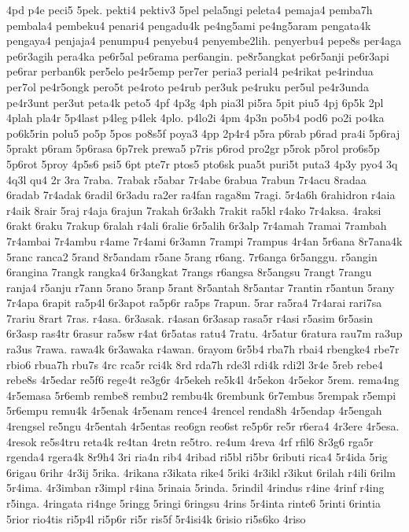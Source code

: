 4pd
p4e
peci5
5pek.
pekti4
pektiv3
5pel
pela5ngi
peleta4
pemaja4
pemba7h
pembala4
pembeku4
penari4
pengadu4k
pe4ng5ami
pe4ng5aram
pengata4k
pengaya4
penjaja4
penumpu4
penyebu4
penyembe2lih.
penyerbu4
pepe8s
per4aga
pe6r3agih
pera4ka
pe6r5al
pe6rama
per6angin.
pe8r5angkat
pe6r5anji
pe6r3api
pe6rar
perban6k
per5elo
pe4r5emp
per7er
peria3
perial4
pe4rikat
pe4rindua
per7ol
pe4r5ongk
pero5t
pe4roto
pe4rub
per3uk
pe4ruku
per5ul
pe4r3unda
pe4r3unt
per3ut
peta4k
peto5
4pf
4p3g
4ph
pia3l
pi5ra
5pit
piu5
4pj
6p5k
2pl
4plah
pla4r
5p4last
p4leg
p4lek
4plo.
p4lo2i
4pm
4p3n
po5b4
pod6
po2i
po4ka
po6k5rin
polu5
po5p
5pos
po8s5f
poya3
4pp
2p4r4
p5ra
p6rab
p6rad
pra4i
5p6raj
5prakt
p6ram
5p6rasa
6p7rek
prewa5
p7ris
p6rod
pro2gr
p5rok
p5rol
pro6s5p
5p6rot
5proy
4p5s6
psi5
6pt
pte7r
ptos5
pto6sk
pua5t
puri5t
puta3
4p3y
pyo4
3q
4q3l
qu4
2r
3ra
7raba.
7rabak
r5abar
7r4abe
6rabua
7rabun
7r4acu
8radaa
6radab
7r4adak
6radil
6r3adu
ra2er
ra4fan
raga8m
7ragi.
5r4a6h
6rahidron
r4aia
r4aik
8rair
5raj
r4aja
6rajun
7rakah
6r3akh
7rakit
ra5kl
r4ako
7r4aksa.
4raksi
6rakt
6raku
7rakup
6ralah
r4ali
6ralie
6r5alih
6r3alp
7r4amah
7ramai
7rambah
7r4ambai
7r4ambu
r4ame
7r4ami
6r3amn
7rampi
7rampus
4r4an
5r6ana
8r7ana4k
5ranc
ranca2
5rand
8r5andam
r5ane
5rang
r6ang.
7r6anga
6r5anggu.
r5angin
6rangina
7rangk
rangka4
6r3angkat
7rangs
r6angsa
8r5angsu
7rangt
7rangu
ranja4
r5anju
r7ann
5rano
5ranp
5rant
8r5antah
8r5antar
7rantin
r5antun
5rany
7r4apa
6rapit
ra5p4l
6r3apot
ra5p6r
ra5ps
7rapun.
5rar
ra5ra4
7r4arai
rari7sa
7rariu
8rart
7ras.
r4asa.
6r3asak.
r4asan
6r3asap
rasa5r
r4asi
r5asim
6r5asin
6r3asp
ras4tr
6rasur
ra5sw
r4at
6r5atas
ratu4
7ratu.
4r5atur
6ratura
rau7m
ra3up
ra3us
7rawa.
rawa4k
6r3awaka
r4awan.
6rayom
6r5b4
rba7h
rbai4
rbengke4
rbe7r
rbio6
rbua7h
rbu7s
4rc
rca5r
rci4k
8rd
rda7h
rde3l
rdi4k
rdi2l
3r4e
5reb
rebe4
rebe8s
4r5edar
re5f6
rege4t
re3g6r
4r5ekeh
re5k4l
4r5ekon
4r5ekor
5rem.
rema4ng
4r5emasa
5r6emb
rembe8
rembu2
rembu4k
6rembunk
6r7embus
5rempak
r5empi
5r6empu
remu4k
4r5enak
4r5enam
rence4
4rencel
renda8h
4r5endap
4r5engah
4rengsel
re5ngu
4r5entah
4r5entas
reo6gn
reo6st
re5p6r
re5r
r6era4
4r3ere
4r5esa.
4resok
re5s4tru
reta4k
re4tan
4retn
re5tro.
re4um
4reva
4rf
rfil6
8r3g6
rga5r
rgenda4
rgera4k
8r9h4
3ri
ria4n
rib4
4ribad
ri5bl
ri5br
6ributi
rica4
5r4ida
5rig
6rigau
6rihr
4r3ij
5rika.
4rikana
r3ikata
rike4
5riki
4r3ikl
r3ikut
6rilah
r4ili
6rilm
5r4ima.
4r3imban
r3impl
r4ina
5rinaia
5rinda.
5rindil
4rindus
r4ine
4rinf
r4ing
r5inga.
4ringata
ri4nge
5ringg
5ringi
6ringsu
4rins
5r4inta
rinte6
5rinti
6rintia
5rior
rio4tis
ri5p4l
ri5p6r
ri5r
ris5f
5r4isi4k
6risio
ri5s6ko
4riso
